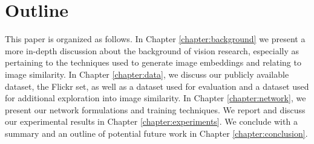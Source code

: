 \section{Outline}
This paper is organized as follows. In Chapter \ref{chapter:background} we present a more in-depth discussion about the background of vision research, especially as pertaining to the techniques used to generate image embeddings and relating to image similarity. In Chapter \ref{chapter:data}, we discuss our publicly available dataset, the Flickr set, as well as a dataset used for evaluation and a dataset used for additional exploration into image similarity. In Chapter \ref{chapter:network}, we present our network formulations and training techniques. We report and discuss our experimental results in Chapter \ref{chapter:experiments}. We conclude with a summary and an outline of potential future work in Chapter \ref{chapter:conclusion}.

